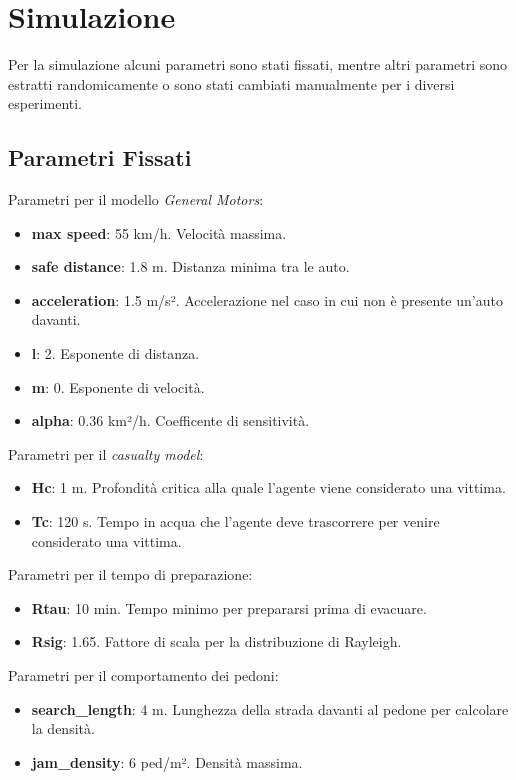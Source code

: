 \section{Simulazione}
\label{sec:simulazione}
Per la simulazione alcuni parametri sono stati fissati, mentre altri parametri sono estratti randomicamente 
o sono stati cambiati manualmente per i diversi esperimenti.

\subsection{Parametri Fissati}
\label{ssec:parametri-fissi}

Parametri per il modello \textit{General Motors}:
\begin{itemize}
    \item \textbf{max speed}: 55 km/h. Velocità massima.
    \item \textbf{safe distance}: 1.8 m. Distanza minima tra le auto.
    \item \textbf{acceleration}: 1.5 m/s². Accelerazione nel caso in cui non è presente un'auto davanti.
    \item \textbf{l}: 2. Esponente di distanza.
    \item \textbf{m}: 0. Esponente di velocità.
    \item \textbf{alpha}: 0.36 km²/h. Coefficente di sensitività. 
\end{itemize}

\noindent
Parametri per il \textit{casualty model}:
\begin{itemize}
  \item \textbf{Hc}: 1 m. Profondità critica alla quale l'agente viene considerato una vittima.
  \item \textbf{Tc}: 120 s. Tempo in acqua che l'agente deve trascorrere per venire considerato una vittima. 
\end{itemize}

\noindent
Parametri per il tempo di preparazione:
\begin{itemize}
  \item \textbf{Rtau}: 10 min. Tempo minimo per prepararsi prima di evacuare.
  \item \textbf{Rsig}: 1.65. Fattore di scala per la distribuzione di Rayleigh.
\end{itemize}

\noindent
Parametri per il comportamento dei pedoni:
\begin{itemize}
  \item \textbf{search\_length}: 4 m. Lunghezza della strada davanti al pedone per calcolare la densità.
  \item \textbf{jam\_density}: 6 ped/m². Densità massima.
\end{itemize}

